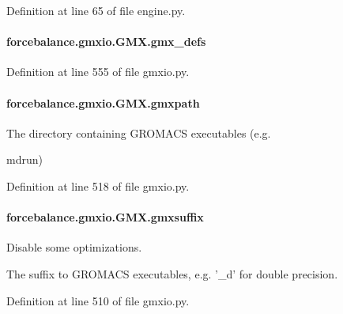 Definition at line 65 of file engine.\-py.

\hypertarget{classforcebalance_1_1gmxio_1_1GMX_a506f2156321a4f0901731203a176f41a}{
\paragraph[{gmx\-\_\-defs}]{\setlength{\rightskip}{0pt plus 5cm}forcebalance.\-gmxio.\-G\-M\-X.\-gmx\-\_\-defs}}\label{classforcebalance_1_1gmxio_1_1GMX_a506f2156321a4f0901731203a176f41a}


Definition at line 555 of file gmxio.\-py.

\hypertarget{classforcebalance_1_1gmxio_1_1GMX_ab2081cd93ac2c3a80e205884e0f12710}{
\paragraph[{gmxpath}]{\setlength{\rightskip}{0pt plus 5cm}forcebalance.\-gmxio.\-G\-M\-X.\-gmxpath}}\label{classforcebalance_1_1gmxio_1_1GMX_ab2081cd93ac2c3a80e205884e0f12710}


The directory containing G\-R\-O\-M\-A\-C\-S executables (e.\-g. 

mdrun) 

Definition at line 518 of file gmxio.\-py.

\hypertarget{classforcebalance_1_1gmxio_1_1GMX_ad3255c98ff1cdd0f3ae115857d899ce5}{
\paragraph[{gmxsuffix}]{\setlength{\rightskip}{0pt plus 5cm}forcebalance.\-gmxio.\-G\-M\-X.\-gmxsuffix}}\label{classforcebalance_1_1gmxio_1_1GMX_ad3255c98ff1cdd0f3ae115857d899ce5}


Disable some optimizations. 

The suffix to G\-R\-O\-M\-A\-C\-S executables, e.\-g. '\-\_\-d' for double precision. 

Definition at line 510 of file gmxio.\-py.

